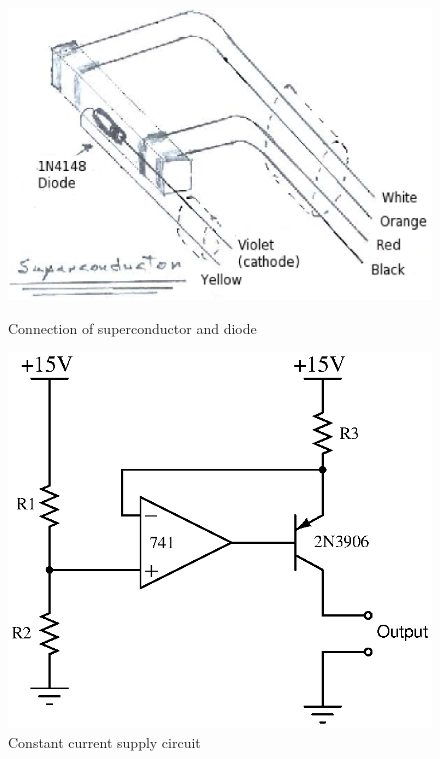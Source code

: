 \documentclass[paper=a4, fontsize=11pt]{scrartcl}
\numberwithin{equation}{section}
\numberwithin{figure}{section}
\numberwithin{table}{section}
\begin{document}
            \begin{figure}[ht]
                  \begin{minipage}[b]{0.45\linewidth}
                        \centering
                        \includegraphics[width=\textwidth]{Figures/SuperconductorDrawing.eps}
                        \caption{Connection of superconductor and diode}
                        \label{fig:scDiode}
                  \end{minipage}
                  \hspace{0.5cm}
                  \begin{minipage}[b]{0.45\linewidth}
                        \centering
                        \includegraphics[width=\textwidth]{Figures/ConstantCurrent.eps}
                        \caption{Constant current supply circuit}
                        \label{fig:constantCurrent}
                  \end{minipage}
            \end{figure}
\end{document}
